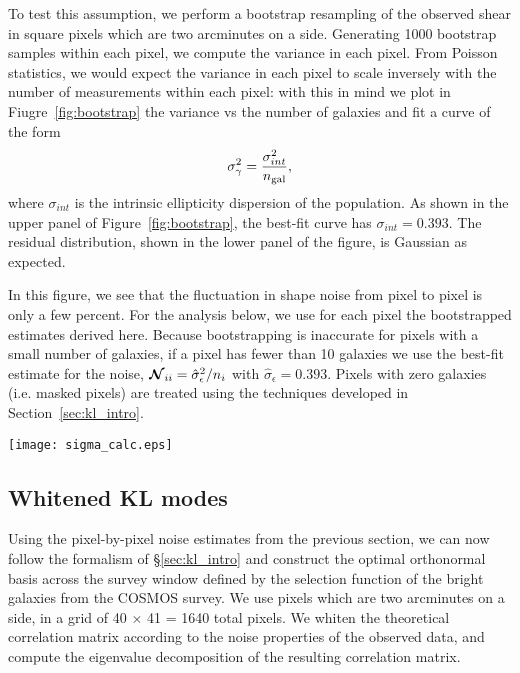 To test this assumption, we perform a bootstrap resampling of the observed
shear in square pixels which are two arcminutes on a side.
Generating 1000 bootstrap samples within each
pixel, we compute the variance in each pixel.
From Poisson statistics, we would expect the variance in each pixel to
scale inversely with the number of measurements within each pixel: with this
in mind we plot in Fiugre~\ref{fig:bootstrap}
the variance vs the number of galaxies and fit a curve of the form 
\begin{equation}
  \sigma_\gamma^2 = \frac{\sigma_{int}^2}{n_{\rm gal}},
\end{equation}
where $\sigma_{int}$ is the intrinsic ellipticity dispersion of the population.
As shown in the upper panel of Figure~\ref{fig:bootstrap}, the best-fit
curve has $\sigma_{int} = 0.393$.  The residual distribution, shown in the
lower panel of the figure, is Gaussian as expected.

In this figure, we see that the fluctuation in shape noise from pixel to
pixel is only a few percent.  For the analysis below, we use for each pixel
the bootstrapped estimates derived here.  Because bootstrapping is inaccurate
for pixels with a small number of galaxies, if a pixel has fewer than 10
galaxies we use the best-fit estimate for the noise,
$\boldsymbol{\mathcal{N}}_{ii} = \hat{\sigma}_\epsilon^2 / n_i$
with $\hat{\sigma}_\epsilon = 0.393$.  Pixels with zero galaxies (i.e.
masked pixels) are treated using the techniques developed in
Section~\ref{sec:kl_intro}.

\begin{figure*}
 \centering
 \texttt{[image: sigma\_calc.eps]}
 \caption{Bootstrap estimates of the shape noise for each pixel.  The estimates
   reflect an intrinsic ellipticity of $0.393 \pm 0.013$.
   \label{fig:bootstrap}}
\end{figure*}

\subsection{Whitened KL modes}
Using the pixel-by-pixel noise estimates from the previous section, we can
now follow the formalism of \S\ref{sec:kl_intro} and construct the optimal
orthonormal basis across the survey window defined by the selection function
of the bright galaxies from the COSMOS survey.  We use pixels which are
two arcminutes on a side, in a grid of 40 $\times$ 41 = 1640 total
pixels.  We whiten the theoretical correlation matrix according to the noise
properties of the observed data, and compute the eigenvalue decomposition
of the resulting correlation matrix.


